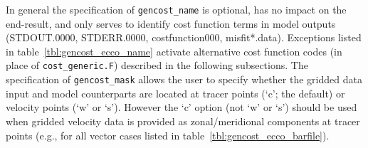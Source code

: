In general the specification of \texttt{gencost\_name} is optional, has no impact on the end-result, and only serves to identify cost function terms in model outputs (STDOUT.0000, STDERR.0000, costfunction000, misfit*.data). Exceptions listed in table~\ref{tbl:gencost_ecco_name} activate alternative cost function codes (in place of \texttt{cost\_generic.F}) described in the following subsections. The specification of \texttt{gencost\_mask} allows the user to specify whether the gridded data input and model counterparts are located at tracer points (`c'; the default) or velocity points (`w' or `s'). However the `c' option (not `w' or `s') should be used when gridded velocity data is provided as zonal/meridional components at tracer points (e.g., for all vector cases listed in table~\ref{tbl:gencost_ecco_barfile}). 

